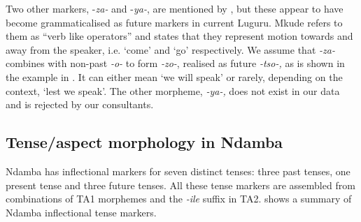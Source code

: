 \documentclass[output=paper,
            colorlinks, citecolor=brown
            ,draftmode
		  ]{langscibook}
\begin{document}
Two other markers, -\textit{za-} and -\textit{ya-}, are mentioned by \citet[77, 101]{Mkude1974}, but these appear to have become grammaticalised as future markers in current Luguru. Mkude refers to them as “verb like operators” and states that they represent motion towards and away from the speaker, i.e. `come' and `go' respectively. We assume that \textit{{}-za-} combines with non-past \textit{{}-o-} to form \textit{{}-zo-}, realised as future \textit{{}-tso-,} as is shown in the example in . It can either mean `we will speak' or rarely, depending on the context, `lest we speak'. The other morpheme, \textit{-ya-,} does not exist in our data and is rejected by our consultants. 


\subsection{Tense/aspect morphology in Ndamba}
\label{sec:petzell:3.5}
Ndamba has inflectional markers for seven distinct tenses: three past tenses, one present tense and three future tenses. All these tense markers are assembled from combinations of TA1 morphemes and the \textit{{}-ile} suffix in TA2.  shows a summary of Ndamba inflectional tense markers. 
\end{document}
